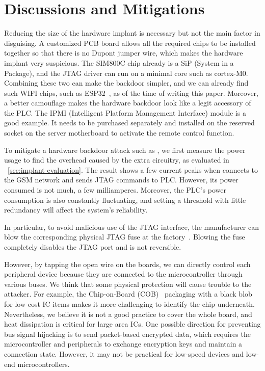 \section{Discussions and Mitigations}
\label{sec:implant-discussion}

Reducing the size of the hardware implant is necessary but not the main factor in disguising. A customized PCB board allows all the required chips to be installed together so that there is no Dupont jumper wire, which makes the hardware implant very suspicious. The SIM800C chip already is a SiP (System in a Package), and the JTAG driver can run on a minimal core such as cortex-M0. Combining these two can make the backdoor simpler, and we can already find such WIFI chips, such as ESP32~\cite{pravalika2019internet}, as of the time of writing this paper. Moreover, a better camouflage makes the hardware backdoor look like a legit accessory of the PLC. The IPMI (Intelligent Platform Management Interface) module is a good example. It needs to be purchased separately and installed on the reserved socket on the server motherboard to activate the remote control function.

To mitigate a hardware backdoor attack such as \name, we first measure the power usage to find the overhead caused by the extra circuitry, as evaluated in ~\autoref{sec:implant-evaluation}. The result shows a few current peaks when \name connects to the GSM network and sends JTAG commands to PLC. However, its power consumed is not much, a few milliamperes. Moreover, the PLC's power consumption is also constantly fluctuating, and setting a threshold with little redundancy will affect the system's reliability.

In particular, to avoid malicious use of the JTAG interface, the manufacturer can blow the corresponding physical JTAG fuse at the factory~\cite{rosenfeld2010attacks, buskey2006protected}. Blowing the fuse completely disables the JTAG port and is not reversible.

However, by tapping the open wire on the boards, we can directly control each peripheral device because they are connected to the microcontroller through various buses. We think that some physical protection will cause trouble to the attacker. For example, the Chip-on-Board (COB)~\cite{lau1994chip} packaging with a black blob for low-cost IC items makes it more challenging to identify the chip underneath. Nevertheless, we believe it is not a good practice to cover the whole board, and heat dissipation is critical for large area ICs. One possible direction for preventing bus signal hijacking is to send packet-based encrypted data, which requires the microcontroller and peripherals to exchange encryption keys and maintain a connection state. However, it may not be practical for low-speed devices and low-end microcontrollers.

